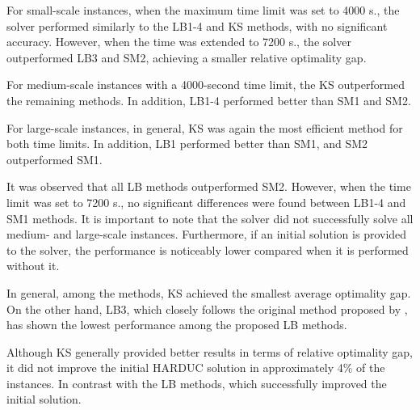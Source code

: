 For small-scale instances, when the maximum time limit was set to 4000 s., the solver performed similarly to the LB1-4 and KS methods, with no significant accuracy. However, when the time was extended to 7200 s., the solver outperformed LB3 and SM2, achieving a smaller relative optimality gap.

For medium-scale instances with a 4000-second time limit, the KS outperformed the remaining methods. In addition, LB1-4 performed better than SM1 and SM2.

For large-scale instances, in general, KS was again the most efficient method for both time limits. In addition, LB1 performed better than SM1, and SM2 outperformed SM1. 

It was observed that all LB methods outperformed SM2. However, when the time limit was set to 7200 s., no significant differences were found between LB1-4 and SM1 methods. It is important to note that the solver did not successfully solve all medium- and large-scale instances. Furthermore, if an initial solution is provided to the solver, the performance is noticeably lower compared when it is performed without it.


In general, among the methods, KS achieved the smallest average optimality gap. On the other hand, LB3, which closely follows the original method proposed by \citet{Fischetti2003}, has shown the lowest performance among the proposed LB methods. 

Although KS generally provided better results in terms of relative optimality gap, it did not improve the initial HARDUC solution in approximately 4\% of the instances. In contrast with the LB methods, which successfully improved the initial solution.
